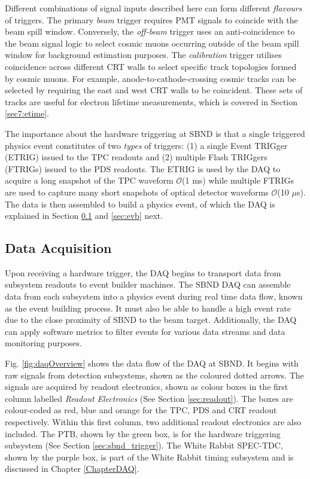 Different combinations of signal inputs described here can form different \textit{flavours} of triggers.
The primary \textit{beam} trigger requires PMT signals to coincide with the beam spill window.
Conversely, the \textit{off-beam} trigger uses an anti-coincidence to the beam signal logic to select cosmic muons occurring outside of the beam spill window for background estimation purposes.
The \textit{calibration} trigger utilises coincidence across different CRT walls to select specific track topologies formed by cosmic muons.
For example, anode-to-cathode-crossing cosmic tracks can be selected by requiring the east and west CRT walls to be coincident.
These sets of tracks are useful for electron lifetime measurements, which is covered in Section \ref{sec7:etime}.

The importance about the hardware triggering at SBND is that a single triggered physics event constitutes of two \textit{types} of triggers: (1) a single Event TRIGger (ETRIG) issued to the TPC readouts and (2) multiple Flash TRIGgers (FTRIGs) issued to the PDS readouts.
The ETRIG is used by the DAQ to acquire a long snapshot of the TPC waveform $\mathcal{O}$(1 ms) while multiple FTRIGs are used to capture many short snapshots of optical detector waveforms $\mathcal{O}$(10 $\mu$s).
The data is then assembled to build a physics event, of which the DAQ is explained in Section \ref{sec4DAQOverview} and \ref{sec:evb} next.

\subsection{Data Acquisition}
\label{sec4DAQOverview}

Upon receiving a hardware trigger, the DAQ begins to transport data from subsystem readouts to event builder machines. 
The SBND DAQ can assemble data from each subsystem into a physics event during real time data flow, known as the event building process.
It must also be able to handle a high event rate due to the close proximity of SBND to the beam target.
Additionally, the DAQ can apply software metrics to filter events for various data streams and data monitoring purposes.

Fig. \ref{fig:daqOverview} shows the data flow of the DAQ at SBND.
It begins with raw signals from detection subsystems, shown as the coloured dotted arrows.
The signals are acquired by readout electronics, shown as colour boxes in the first column labelled \textit{Readout Electronics} (See Section \ref{sec:readout}).
The boxes are colour-coded as red, blue and orange for the TPC, PDS and CRT readout respectively.
Within this first column, two additional readout electronics are also included.
The PTB, shown by the green box, is for the hardware triggering subsystem (See Section \ref{sec:sbnd_trigger}).
The White Rabbit SPEC-TDC, shown by the purple box, is part of the White Rabbit timing subsystem and is discussed in Chapter \ref{ChapterDAQ}.

